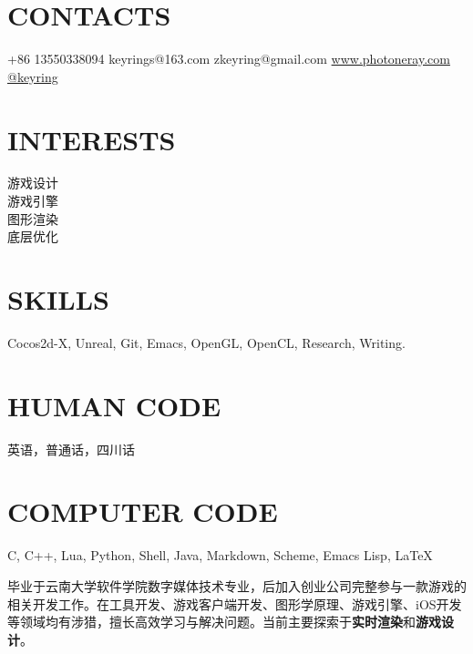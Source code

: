 \documentclass[full]{rvca}
\begin{document}


\begin{aside} %
\section{\uppercase{contacts}}
+86 13550338094 {\faMobile}
keyrings@163.com {\scriptsize\faLink}
zkeyring@gmail.com {\scriptsize\faLink}
\href{http://www.photoneray.com}{\color{sidebandtextcolor}www.photoneray.com \faGlobe} 
\href{https://github.com/keyring}{\color{sidebandtextcolor}@keyring \faGithub}
\ghost
\section{\uppercase{interests}}
游戏设计\\游戏引擎\\图形渲染\\底层优化
%
\ghost
\section{\uppercase{skills}}
{\scriptsize\faHeart}Cocos2d-X, Unreal, Git, Emacs, OpenGL, OpenCL, Research, Writing.
\ghost 
\section{\uppercase{human code}}
英语，普通话，四川话
\ghost
\section{\uppercase{computer code}}
{\scriptsize\faHeart}C, C++, {\scriptsize\faHeart}Lua, Python, Shell, Java, Markdown, Scheme, Emacs Lisp, \LaTeX
\ghost
\end{aside}



\begin{statement}
毕业于云南大学软件学院数字媒体技术专业，后加入创业公司完整参与一款游戏的相关开发工作。在工具开发、游戏客户端开发、图形学原理、游戏引擎、iOS开发等领域均有涉猎，擅长高效学习与解决问题。当前主要探索于\textbf{实时渲染}和\textbf{游戏设计}。
\end{statement}

\subsection{}
\end{document}
